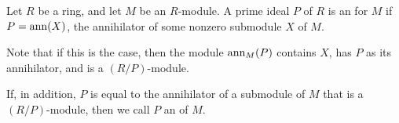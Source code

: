 \documentclass{article}
\begin{document}
Let $R$ be a ring, 
and let $M$ be an $R$-module.
A prime ideal $P$ of $R$ 
is an {} for $M$
if $P={\rm ann}(X)$, the annihilator of some nonzero submodule $X$ of $M$.

Note that if this is the case, then the module ${\rm ann}_M(P)$ contains $X$, has $P$ as its annihilator,
and is a  $(R/P)$-module.

If, in addition, $P$ is equal to the annihilator of a submodule of $M$ that is a  $(R/P)$-module, then we call $P$ an {} of $M$.
\end{document}
